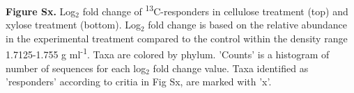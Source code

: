 \textbf{Figure Sx.}  Log$_{2}$ fold change of \textsuperscript{13}C-responders in cellulose treatment (top) and xylose treatment (bottom).  Log$_{2}$ fold change is based on the relative abundance in the experimental treatment compared to the control within the density range 1.7125-1.755 g ml\textsuperscript{-1}. Taxa are colored by phylum. 'Counts' is a histogram of number of sequences for each log$_{2}$ fold change value. Taxa identified as 'responders' according to critia in Fig Sx, are marked with 'x'. 